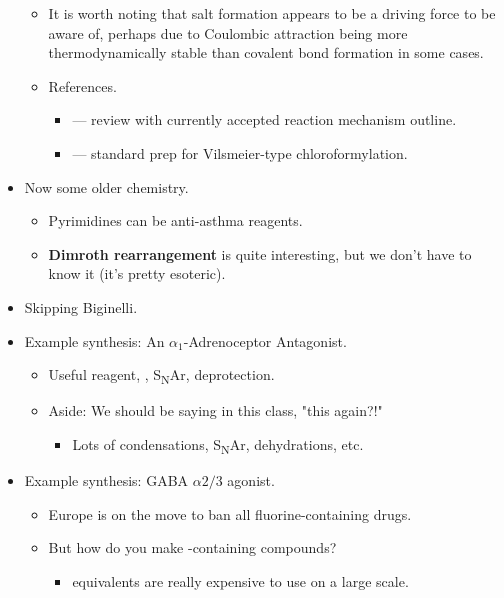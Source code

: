 \documentclass[../notes.tex]{subfiles}
\begin{document}
\begin{itemize}
\begin{itemize}
\begin{itemize}
        \end{itemize}
        \item It is worth noting that salt formation appears to be a driving force to be aware of, perhaps due to Coulombic attraction being more thermodynamically stable than covalent bond formation in some cases.
        \item References.
        \begin{itemize}
            \item \textcite[3663-3665]{bib:VilsmeierChloroformylationMech} --- review with currently accepted reaction mechanism outline.
            \item \textcite[12-13]{bib:VilsmeierChloroformylationPrep} --- standard prep for Vilsmeier-type chloroformylation.
        \end{itemize}
    \end{itemize}
    \item Now some older chemistry.
    \begin{itemize}
        \item Pyrimidines can be anti-asthma reagents.
        \item \textbf{Dimroth rearrangement} is quite interesting, but we don't have to know it (it's pretty esoteric).
    \end{itemize}
    \item Skipping Biginelli.
    \item Example synthesis: An $\alpha_1$-Adrenoceptor Antagonist.
    \begin{itemize}
        \item Useful reagent, , S\textsubscript{N}Ar, deprotection.
        \item Aside: We should be saying in this class, "this again?!"
        \begin{itemize}
            \item Lots of condensations, S\textsubscript{N}Ar, dehydrations, etc.
        \end{itemize}
    \end{itemize}
    \item Example synthesis: GABA $\alpha 2/3$ agonist.
    \begin{itemize}
        \item Europe is on the move to ban all fluorine-containing drugs.
        \item But how do you make -containing compounds?
        \begin{itemize}
            \item {} equivalents are really expensive to use on a large scale.

\end{itemize}
\end{itemize}
\end{itemize}
\end{document}
